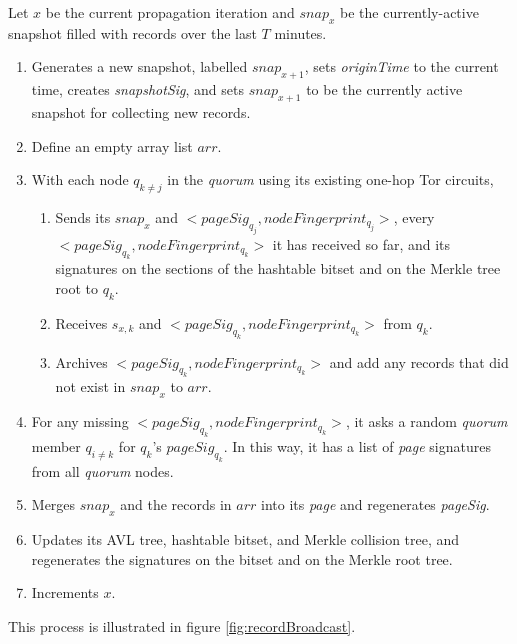 Let $ x $ be the current propagation iteration and $ snap_{x} $ be the currently-active snapshot filled with records over the last $ T $ minutes.

\begin{enumerate}
	\item Generates a new snapshot, labelled $ snap_{x+1} $, sets \emph{originTime} to the current time, creates \emph{snapshotSig}, and sets $ snap_{x+1} $ to be the currently active snapshot for collecting new records.
	\item Define an empty array list $ arr $.
	\item With each node $ q_{k \ne j} $ in the \emph{quorum} using its existing one-hop Tor circuits, 
		\begin{enumerate}
			\item Sends its $ snap_{x} $ and $ <pageSig_{q_{j}}, nodeFingerprint_{q_{j}}> $, every $ <pageSig_{q_{k}}, nodeFingerprint_{q_{k}}> $ it has received so far, and its signatures on the sections of the hashtable bitset and on the Merkle tree root to $ q_{k} $.
			\item Receives $ s_{x, k} $ and $ <pageSig_{q_{k}}, nodeFingerprint_{q_{k}}> $ from $ q_{k} $.
			\item Archives $ <pageSig_{q_{k}}, nodeFingerprint_{q_{k}}> $ and add any records that did not exist in $ snap_{x} $ to $ arr $.
		\end{enumerate}
	\item For any missing $ <pageSig_{q_{k}}, nodeFingerprint_{q_{k}}> $, it asks a random \emph{quorum} member $ q_{i \ne k} $ for $ q_{k} $'s $ pageSig_{q_{k}} $. In this way, it has a list of \emph{page} signatures from all \emph{quorum} nodes.
	\item Merges $ snap_{x} $ and the records in $ arr $ into its \emph{page} and regenerates \emph{pageSig}.
	\item Updates its AVL tree, hashtable bitset, and Merkle collision tree, and regenerates the signatures on the bitset and on the Merkle root tree.
	\item Increments $ x $.
\end{enumerate}

This process is illustrated in figure \ref{fig:recordBroadcast}.

